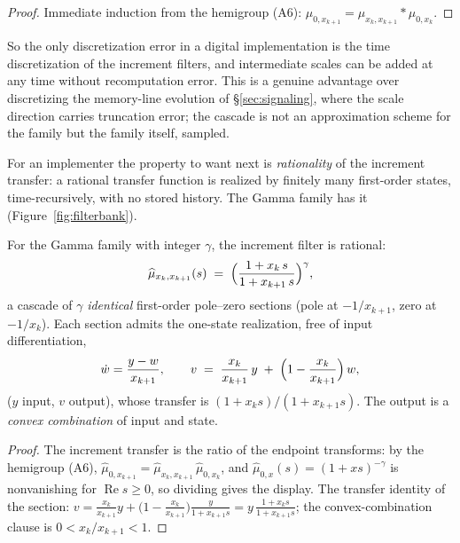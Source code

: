 \begin{proof}
Immediate induction from the hemigroup (A6): $\mu_{0,x_{k+1}} = \mu_{x_k, x_{k+1}} * \mu_{0,x_k}$.
\end{proof}

So the only discretization error in a digital implementation is the time discretization of
the increment filters, and intermediate scales can be added at any time without
recomputation error. This is a genuine advantage over discretizing the memory-line evolution
of \S\ref{sec:signaling}, where the scale direction carries truncation error; the cascade is
not an approximation scheme for the family but the family itself, sampled.

For an implementer the property to want next is \emph{rationality} of the increment
transfer: a rational transfer function is realized by finitely many first-order states,
time-recursively, with no stored history. The Gamma family has it
(Figure~\ref{fig:filterbank}).



\begin{proposition}\label{prop:gamma-cascade}
For the Gamma family with integer $\gamma$, the increment filter is rational:
\[
  \widehat{\mu}_{x_k, x_{k+1}}(s) \;=\; \Bigl(\frac{1 + x_k\, s}{1 + x_{k+1}\, s}\Bigr)^{\gamma},
\]
a cascade of $\gamma$ \emph{identical} first-order pole--zero sections (pole at $-1/x_{k+1}$,
zero at $-1/x_k$). Each section admits the one-state realization, free of input differentiation,
\[
  \dot w = \frac{y - w}{x_{k+1}}, \qquad
  v \;=\; \frac{x_k}{x_{k+1}}\, y \;+\; \Bigl(1 - \frac{x_k}{x_{k+1}}\Bigr)\, w,
\]
($y$ input, $v$ output), whose transfer is $(1 + x_k s)/(1 + x_{k+1} s)$. The output is a
\emph{convex combination} of input and state.
\end{proposition}

\begin{proof}
The increment transfer is the ratio of the endpoint transforms: by the hemigroup (A6),
$\widehat{\mu}_{0,x_{k+1}} = \widehat{\mu}_{x_k,x_{k+1}}\,\widehat{\mu}_{0,x_k}$, and
$\widehat{\mu}_{0,x}(s) = (1 + x s)^{-\gamma}$ is nonvanishing for $\operatorname{Re} s \ge 0$,
so dividing gives the display. The transfer identity of the section:
$v = \tfrac{x_k}{x_{k+1}} y + \bigl(1 - \tfrac{x_k}{x_{k+1}}\bigr)\tfrac{y}{1 + x_{k+1}s}
= y\,\tfrac{1 + x_k s}{1 + x_{k+1} s}$; the convex-combination clause is
$0 < x_k/x_{k+1} < 1$.
\end{proof}

